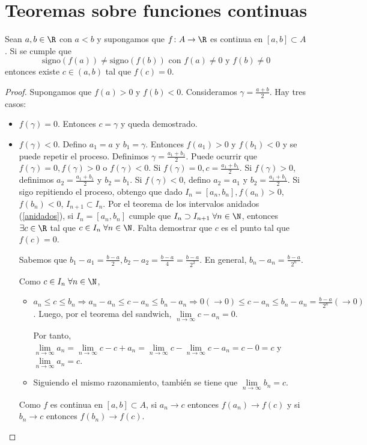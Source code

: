 \section{Teoremas sobre funciones continuas}
\begin{theorem}[de Bolzano]
	Sean \(a,b \in \R \) con \(a < b \) y supongamos que \(f \colon A \to \R \) es continua en \([a,b] \subset A \). Si se cumple que
	\[
		\text{signo}(f(a)) \neq \text{signo}(f(b)) \text{ con } f(a) \neq 0 \text{ y } f(b) \neq 0
	\]
	entonces existe \(c \in (a,b )\) tal que \(f(c) = 0 \).
\end{theorem}
\begin{proof}
	Supongamos que \(f(a) > 0 \) y \(f(b) < 0\). Consideramos \(\gamma = \frac{a + b}{2}\). Hay tres casos:
	\begin{itemize}
		\item \(f(\gamma) = 0\). Entonces \(c = \gamma\) y queda demostrado.
		\item \(f(\gamma) < 0 \). Defino \(a_1 = a \) y \(b_1 = \gamma\). Entonces \(f(a_1) >0 \) y \(f(b_1) < 0 \) y se puede repetir el proceso. Definimos \(\gamma = \frac{a_1 + b_1 }{2 }\). Puede ocurrir que \(f(\gamma) = 0, f(\gamma) > 0 \) o \(f(\gamma) < 0 \). Si \(f(\gamma) = 0, c = \frac{a_1 + b_1}{2}\). Si \(f(\gamma) > 0 \), definimos \(a_2 = \frac{a_1 + b_1 }{2 }\) y \(b_2 = b_1\). Si \(f(\gamma) < 0 \), defino \(a_2 = a_1 \) y \(b_2 = \frac{a_1 + b_1 }{2 }\). Si sigo repitiendo el proceso, obtengo que dado \(I_n = [a_n,b_n], f(a_n) > 0 \), \(f(b_n) < 0 \), \(I_{n+1} \subset I_n \). Por el teorema de los intervalos anidados (\ref{anidados}), si \(I_n = [a_n,b_n ]\) cumple que \(I_n \supset I_{n+1} \; \forall n \in \N \), entonces \(\exists c \in \R \) tal que \(c \in I_n \; \forall  n \in \N \). Falta demostrar que \(c \) es el punto tal que \(f(c) = 0\).
		      
		      Sabemos que \(b_1 - a_1 = \frac{b - a }{2}, b_2 - a_2 = \frac{b - a }{4} = \frac{b - a }{2^{2} }\). En general, \(b_n - a_n = \frac{b - a }{2^{n} }\).
		      
		      Como \(c \in I_n \;\forall n \in \N \),
		      \begin{itemize}
			      \item \(a_n \leq c \leq b_n \Rightarrow a_n - a_n \leq c - a_n \leq b_n - a_n \Rightarrow 0(\rightarrow 0) \leq c - a_n \leq b_n - a_n = \frac{b - a }{2^{n} }(\rightarrow 0)\). Luego, por el teorema del sandwich, \(\lim\limits_{n \to \infty} c - a_n = 0 \).
			            
			            Por tanto, \(\lim\limits_{n \to \infty} a_n = \lim\limits_{n \to \infty} c - c + a_n = \lim\limits_{n \to \infty} c - \lim\limits_{n \to \infty} c - a_n = c - 0 = c \) y \(\lim\limits_{n \to \infty} a_n = c \).
			      \item Siguiendo el mismo razonamiento, también se tiene que \(\lim\limits_{n \to \infty} b_n = c \).
		      \end{itemize}
		      Como \(f \) es continua en \([a,b] \subset A \), si \(a_n \rightarrow c \) entonces \(f(a_n) \rightarrow f(c )\) y si \(b_n \rightarrow c \) entonces \(f(b_n) \rightarrow f(c )\).
		      

\end{itemize}
\end{proof}
